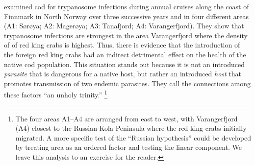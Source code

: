 \documentclass[11pt]{book}\usepackage[]{graphicx}\usepackage[]{color}
\begin{document}
 
\citet{Hemmingsen-etal:2005} examined cod for trypanosome infections during annual cruises along the coast of Finnmark in North Norway over three successive years and in four different areas 
(A1: S{\o}r{\o}ya; A2: Mager{\o}ya; A3: Tanafjord; A4: Varangerfjord).
They show that trypanosome infections are strongest in the area Varangerfjord where the density of of red king crabs is highest. Thus, there is evidence that the introduction of the foreign red king crabs had an indirect detrimental effect on the health of the native cod population. This situation stands out because it is not an introduced \emph{parasite} that is dangerous for a native host, but rather an introduced \emph{host} that promotes transmission of two endemic parasites. They call the connections among these factors ``an unholy trinity.''%
\footnote{\label{fn:russian}
The four areas A1--A4 are arranged from east to west, with Varangerfjord (A4) closest to the Russian
Kola Peninsula where the red king crabs initially migrated.  A more specific test of the 
``Russian hypothesis'' could be developed by treating area as an ordered factor and testing
the linear component.  We leave this analysis to an exercise for the reader.
}
\end{document}
